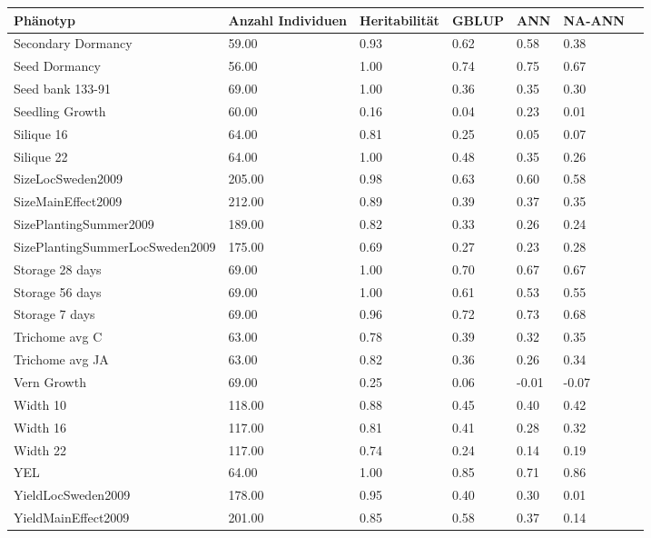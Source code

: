 \documentclass[ngerman,onecolumn,bibliography=totocnumbered]{scrreprt}
\begin{document}
\begin{table}[]
\begin{tabular}{|l|l|l|l|l|l|l|}
\hline
Phänotyp 					& Anzahl Individuen & Heritabilität & GBLUP & ANN 	 & NA-ANN \\ \hline
Secondary Dormancy  & 59.00  & 0.93  & 0.62  & 0.58  & 0.38 \\ \hline
Seed Dormancy  & 56.00  & 1.00  & 0.74  & 0.75  & 0.67 \\ \hline
Seed bank 133-91  & 69.00  & 1.00  & 0.36  & 0.35  & 0.30 \\ \hline
Seedling Growth  & 60.00  & 0.16  & 0.04  & 0.23  & 0.01 \\ \hline
Silique 16  & 64.00  & 0.81  & 0.25  & 0.05  & 0.07 \\ \hline
Silique 22  & 64.00  & 1.00  & 0.48  & 0.35  & 0.26 \\ \hline
SizeLocSweden2009  & 205.00  & 0.98  & 0.63  & 0.60  & 0.58 \\ \hline
SizeMainEffect2009  & 212.00  & 0.89  & 0.39  & 0.37  & 0.35 \\ \hline
SizePlantingSummer2009  & 189.00  & 0.82  & 0.33  & 0.26  & 0.24 \\ \hline
SizePlantingSummerLocSweden2009  & 175.00  & 0.69  & 0.27  & 0.23  & 0.28 \\ \hline
Storage 28 days  & 69.00  & 1.00  & 0.70  & 0.67  & 0.67 \\ \hline
Storage 56 days  & 69.00  & 1.00  & 0.61  & 0.53  & 0.55 \\ \hline
Storage 7 days  & 69.00  & 0.96  & 0.72  & 0.73  & 0.68 \\ \hline
Trichome avg C  & 63.00  & 0.78  & 0.39  & 0.32  & 0.35 \\ \hline
Trichome avg JA  & 63.00  & 0.82  & 0.36  & 0.26  & 0.34 \\ \hline
Vern Growth  & 69.00  & 0.25  & 0.06  & -0.01  & -0.07 \\ \hline
Width 10  & 118.00  & 0.88  & 0.45  & 0.40  & 0.42 \\ \hline
Width 16  & 117.00  & 0.81  & 0.41  & 0.28  & 0.32 \\ \hline
Width 22  & 117.00  & 0.74  & 0.24  & 0.14  & 0.19 \\ \hline
YEL   & 64.00  & 1.00  & 0.85  & 0.71  & 0.86 \\ \hline
YieldLocSweden2009  & 178.00  & 0.95  & 0.40  & 0.30  & 0.01 \\ \hline
YieldMainEffect2009  & 201.00  & 0.85  & 0.58  & 0.37  & 0.14 \\ \hline

\end{tabular}
\end{table}
\end{document}
